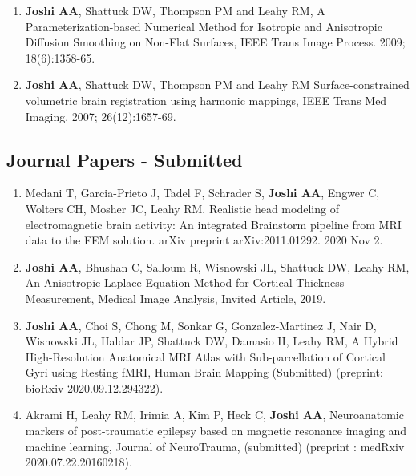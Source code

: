 \documentclass[overlapped,line,letterpaper]{res}
\begin{document}
\begin{resume}
\begin{enumerate}
    \item \textbf{Joshi AA}, Shattuck DW, Thompson PM and Leahy RM, {A Parameterization-based Numerical Method for Isotropic and Anisotropic Diffusion Smoothing on Non-Flat Surfaces}, IEEE Trans Image Process. 2009; 18(6):1358-65.

    \item \textbf{Joshi AA}, Shattuck DW, Thompson PM and Leahy RM {Surface-constrained volumetric brain registration using harmonic mappings}, IEEE Trans Med Imaging. 2007; 26(12):1657-69.
\end{enumerate}



\subsection{Journal Papers - Submitted}
\begin{enumerate}
\item Medani T, Garcia-Prieto J, Tadel F, Schrader S, \textbf{Joshi AA}, Engwer C, Wolters CH, Mosher JC, Leahy RM. Realistic head modeling of electromagnetic brain activity: An integrated Brainstorm pipeline from MRI data to the FEM solution. arXiv preprint arXiv:2011.01292. 2020 Nov 2.
 

\item \textbf{Joshi AA}, Bhushan C, Salloum R, Wisnowski JL, Shattuck DW, Leahy RM, {An Anisotropic Laplace Equation Method for Cortical Thickness Measurement}, Medical Image Analysis, Invited Article, 2019.

\item \textbf{Joshi AA}, Choi S, Chong M, Sonkar G, Gonzalez-Martinez J, Nair D, Wisnowski JL, Haldar JP, Shattuck DW, Damasio H, Leahy RM, {A Hybrid High-Resolution Anatomical MRI Atlas with Sub-parcellation of Cortical Gyri using Resting fMRI}, Human Brain Mapping (Submitted) (preprint: bioRxiv 2020.09.12.294322).

\item Akrami H, Leahy RM, Irimia A, Kim P, Heck C, \textbf{Joshi AA}, {Neuroanatomic markers of post-traumatic epilepsy based on magnetic resonance imaging and machine learning}, Journal of NeuroTrauma, (submitted) (preprint : medRxiv 2020.07.22.20160218).


\end{enumerate}
\end{resume}
\end{document}
